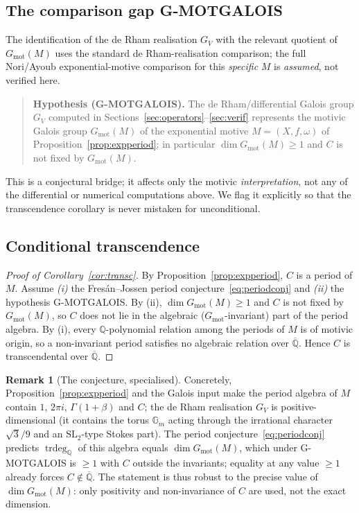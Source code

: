\documentclass[11pt,reqno]{amsart}
\renewcommand{\_}{\vquadorigunderscore\allowbreak}
\theoremstyle{plain}
\theoremstyle{definition}
\newtheorem{remark}[theorem]{Remark}
\newcommand{\Qbar}{\overline{\mathbb{Q}}}
\newcommand{\SL}{\mathrm{SL}}
\newcommand{\Gm}{\mathbb{G}_m}
\providecommand{\C}{}\renewcommand{\C}{C}
\begin{document}
\subsection{The comparison gap G-MOTGALOIS}
The identification of the de Rham realisation $G_V$ with the relevant quotient of
$G_{\mathrm{mot}}(M)$ uses the standard de Rham-realisation comparison; the full Nori/Ayoub
exponential-motive comparison for this \emph{specific} $M$ is \emph{assumed}, not verified here.

\begin{quote}
\textbf{Hypothesis (G-MOTGALOIS).} The de Rham/differential Galois group $G_V$ computed in
Sections~\ref{sec:operators}--\ref{sec:verif} represents the motivic Galois group
$G_{\mathrm{mot}}(M)$ of the exponential motive $M=(X,f,\omega)$ of
Proposition~\ref{prop:expperiod}; in particular $\dim G_{\mathrm{mot}}(M)\ge1$ and $\C$ is not
fixed by $G_{\mathrm{mot}}(M)$.
\end{quote}

This is a conjectural bridge; it affects only the motivic \emph{interpretation}, not any of the
differential or numerical computations above. We flag it explicitly so that the transcendence
corollary is never mistaken for unconditional.

\subsection{Conditional transcendence}
\begin{proof}[Proof of Corollary~\ref{cor:transc}]
By Proposition~\ref{prop:expperiod}, $\C$ is a period of $M$. Assume \emph{(i)} the
Fres\'an--Jossen period conjecture~\eqref{eq:periodconj} and \emph{(ii)} the hypothesis
G-MOTGALOIS. By (ii), $\dim G_{\mathrm{mot}}(M)\ge1$ and $\C$ is not fixed by
$G_{\mathrm{mot}}(M)$, so $\C$ does not lie in the algebraic ($G_{\mathrm{mot}}$-invariant)
part of the period algebra. By (i), every $\mathbb{Q}$-polynomial relation among the periods of
$M$ is of motivic origin, so a non-invariant period satisfies no algebraic relation over
$\Qbar$. Hence $\C$ is transcendental over $\Qbar$.
\end{proof}

\begin{remark}[The conjecture, specialised]\label{rmk:specialised}
Concretely, Proposition~\ref{prop:expperiod} and the Galois input make the period
algebra of $M$ contain $1$, $2\pi i$, $\Gamma(1+\beta)$ and $\C$; the de Rham realisation $G_V$ is
positive-dimensional (it contains the torus $\Gm$ acting through the irrational character
$\sqrt3/9$ and an $\SL_2$-type Stokes part). The period conjecture~\eqref{eq:periodconj} predicts
$\operatorname{trdeg}_{\mathbb{Q}}$ of this algebra equals $\dim G_{\mathrm{mot}}(M)$, which under
G-MOTGALOIS is $\ge1$ with $\C$ outside the invariants; equality at any value $\ge1$ already forces
$\C\notin\Qbar$. The statement is thus robust to the precise value of $\dim G_{\mathrm{mot}}(M)$:
only positivity and non-invariance of $\C$ are used, not the exact dimension.
\end{remark}
\end{document}
